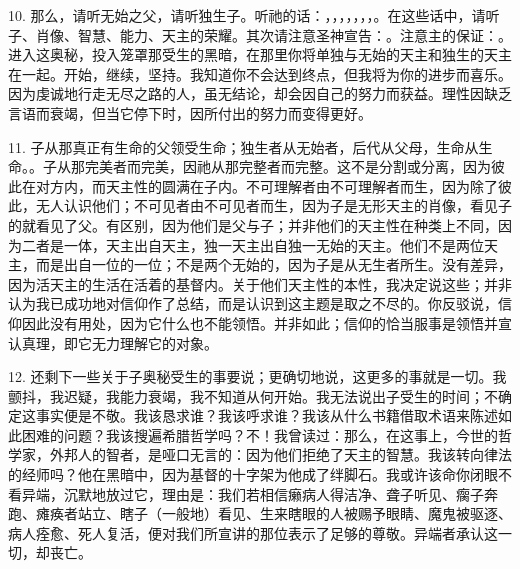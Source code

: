 10. 那么，请听无始之父，请听独生子。听祂的话：，，，，，，，。在这些话中，请听子、肖像、智慧、能力、天主的荣耀。其次请注意圣神宣告：。注意主的保证：。进入这奥秘，投入笼罩那受生的黑暗，在那里你将单独与无始的天主和独生的天主在一起。开始，继续，坚持。我知道你不会达到终点，但我将为你的进步而喜乐。因为虔诚地行走无尽之路的人，虽无结论，却会因自己的努力而获益。理性因缺乏言语而衰竭，但当它停下时，因所付出的努力而变得更好。\par

11. 子从那真正有生命的父领受生命；独生者从无始者，后代从父母，生命从生命。。子从那完美者而完美，因祂从那完整者而完整。这不是分割或分离，因为彼此在对方内，而天主性的圆满在子内。不可理解者由不可理解者而生，因为除了彼此，无人认识他们；不可见者由不可见者而生，因为子是无形天主的肖像，看见子的就看见了父。有区别，因为他们是父与子；并非他们的天主性在种类上不同，因为二者是一体，天主出自天主，独一天主出自独一无始的天主。他们不是两位天主，而是出自一位的一位；不是两个无始的，因为子是从无生者所生。没有差异，因为活天主的生活在活着的基督内。关于他们天主性的本性，我决定说这些；并非认为我已成功地对信仰作了总结，而是认识到这主题是取之不尽的。你反驳说，信仰因此没有用处，因为它什么也不能领悟。并非如此；信仰的恰当服事是领悟并宣认真理，即它无力理解它的对象。\par

12. 还剩下一些关于子奥秘受生的事要说；更确切地说，这更多的事就是一切。我颤抖，我迟疑，我能力衰竭，我不知道从何开始。我无法说出子受生的时间；不确定这事实便是不敬。我该恳求谁？我该呼求谁？我该从什么书籍借取术语来陈述如此困难的问题？我该搜遍希腊哲学吗？不！我曾读过：那么，在这事上，今世的哲学家，外邦人的智者，是哑口无言的：因为他们拒绝了天主的智慧。我该转向律法的经师吗？他在黑暗中，因为基督的十字架为他成了绊脚石。我或许该命你闭眼不看异端，沉默地放过它，理由是：我们若相信癞病人得洁净、聋子听见、瘸子奔跑、瘫痪者站立、瞎子（一般地）看见、生来瞎眼的人被赐予眼睛、魔鬼被驱逐、病人痊愈、死人复活，便对我们所宣讲的那位表示了足够的尊敬。异端者承认这一切，却丧亡。\par

